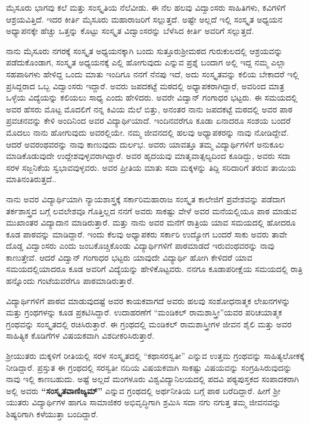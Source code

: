 {ಮೈಸೂರು ಭಾಗವು ಕಲೆ ಮತ್ತು ಸಂಸ್ಕೃತಿಯ ನೆಲೆವೀಡು. ಈ ನೆಲ ಹಲವು ವಿದ್ವಾಂಸರು ಸಾಹಿತಿಗಳು, ಕವಿಗಳಿಗೆ ಆಶ್ರಯವಿತ್ತಿದೆ. ಇದರ ಕೀರ್ತಿ ಮೈಸೂರು ಮಹಾರಾಜರಿಗೆ ಸಲ್ಲುತ್ತದೆ. ಅಷ್ಟೇ ಅಲ್ಲದೆ ಇಲ್ಲಿ ಸಂಸ್ಕೃತ ಅಧ್ಯಯನ ಅಧ್ಯಾಪನಕ್ಕೇ ಹೆಚ್ಚು ಒತ್ತನ್ನು ಕೊಟ್ಟು ಸಂಸ್ಕೃತ ವಿದ್ವಾಂಸರನ್ನು ಬೆಳೆಸಿದ ಕೀರ್ತಿ ಅವರಿಗೆ ಸಲ್ಲುತ್ತದೆ.

ನಾನು ಮೈಸೂರು ನಗರಕ್ಕೆ ಸಂಸ್ಕೃತ ಅಧ್ಯಯನಕ್ಕಾಗಿ ಬಂದು ಸುತ್ತೂರು\break ಶ್ರೀಮಠದ ಗುರುಕುಲದಲ್ಲಿ ಆಶ್ರಯವನ್ನು ಪಡೆದುಕೊಂಡಾಗ, ಸಂಸ್ಕೃತ ಅಧ್ಯಯನಕ್ಕೆ ಎಲ್ಲಿ ಹೋಗುವುದು ಎನ್ನುವ ಪ್ರಶ್ನೆ ಬಂದಾಗ ಅಲ್ಲಿ ಇದ್ದ ನಮ್ಮ ಎಲ್ಲಾ ಸಹಪಾಠಿಗಳು ಹೇಳಿದ್ದ ಒಂದು ಮಾತು ಇಂದಿಗೂ ನನಗೆ ನೆನಪು ಇದೆ, ಅದು ಸಂಸ್ಕೃತವನ್ನು ಕಲಿಯ ಬೇಕಾದರೆ ಇಲ್ಲಿ ಪ್ರಸಿದ್ದರಾದ ಒಬ್ಬ ವಿದ್ವಾಂಸರು ಇದ್ದಾರೆ. ಅವರು ಜಪದಕಟ್ಟೆ ಮಠದಲ್ಲಿ ಅಧ್ಯಾಪಕರಾಗಿದ್ದಾರೆ, ಅವರಿಂದ ಮಾತ್ರ ಒಳ್ಳೆಯ ವಿದ್ಯೆಯನ್ನು ಕಲಿಯಲು ಸಾಧ್ಯ ಎಂದು ಹೇಳಿದರು. ಅವರೇ ವಿದ್ವಾನ್ ಗಂಗಾಧರ ಭಟ್ಟರು. ಈ ಸಮಯದಲ್ಲಿ ಅವರ ಹೆಸರು ಮೊಟ್ಟ ಮೊದಲಿಗೆ ನನ್ನ ಕಿವಿಯ ಮೆಲೆ ಬಿತ್ತು, ಅನಂತರ ನಾನು ಜಪದಕಟ್ಟೆ ಮಠದಲ್ಲಿ ಅವರ ಪಾಠ ಪ್ರವಚನವನ್ನು ಕೇಳಿ ಅಂದಿನಿಂದ ಅವರ ವಿದ್ಯಾರ್ಥಿಯಾದೆ. ಇಂದಿನವರೆಗೂ ಕೂಡಾ ಏನಾದರೂ ಸಂಶಯ ಬಂದರೆ ಮೊದಲು ನಾನು ಹೋಗುವುದು ಅವರಲ್ಲಿಯೇ. ನಮ್ಮ ಜೀವನದಲ್ಲಿ ಹಲವು ಅಧ್ಯಾಪಕರನ್ನು ನಾವು ನೋಡಿದ್ದೇವೆ. ಆದರೆ ಅವರಂಥವರನ್ನು ನಾವು ಕಾಣುವುದು ದುರ್ಲಭ. ಅವರು ಯಾವತ್ತೂ ತಮ್ಮ ವಿದ್ಯಾರ್ಥಿಗಳಿಗೆ ಅನುಕೂಲ ಮಾಡಿಕೊಡುವುದೇ ಉದ್ದೇಶವುಳ್ಳವರಾಗಿದ್ದಾರೆ. ಅವರ ಹೃದಯವು ಮಾತೃವಾತ್ಸಲ್ಯದಿಂದ ಕೂಡಿದ್ದು, ಅವರು ಸದಾ ಸರಳ ಸಜ್ಜನಿಕೆಯ ಸ್ವಭಾವವುಳ್ಳವರು. ಅವರ ಪ್ರೀತಿಯ ಮಾತು ಸದಾ ಮಕ್ಕಳನ್ನು ತಿದ್ದಿ ಸರಿದಾರಿಗೆ ತರುವ ತಾಯಿಯ ಮಾತಿನಂತಿರುತ್ತದೆ..

ನಾನು ಅವರ ವಿದ್ಯಾರ್ಥಿಯಾಗಿ ನ್ಯಾಯಶಾಸ್ತ್ರಕ್ಕೆ ಸರ್ಕಾರಿಮಹಾರಾಜ ಸಂಸ್ಕೃತ ಕಾಲೇಜಿಗೆ ಪ್ರವೇಶವನ್ನು ಪಡೆದಾಗ ತರ್ಕಶಾಸ್ತ್ರದ ಬಗ್ಗೆ ಲವಲೇಶವೂ ಗೊತ್ತಿಲ್ಲದ ನನಗೆ ಅವರು ಸಾಕಷ್ಟು ವೇಳೆ ಅವರ ಮನೆಯಲ್ಲಿಯೂ ಪಾಠ ಮಾಡುವ ಮುಖಾಂತರ ವಿದ್ಯಾದಾನ ಮಾಡಿರುತ್ತಾರೆ. ಮತ್ತು ನಾನು ಅವರ ಮನೆಗೆ ರಾತ್ರಿಯ ಯಾವ ಸಮಯದಲ್ಲಿ ಹೋದರೂ ಕೂಡ ಪಾಠವನ್ನು ಮಾಡಿದ್ದಾರೆ. ಇಂದು ಕೆಲವು ಅಧ್ಯಾಪಕರು ಸರ್ಕಾರಿ ಉದ್ಯೋಗ ಬಂದರೆ ಸಾಕು ಅವರು ತಾವೇ ದೊಡ್ಡ ವಿದ್ವಾಂಸರು ಎಂದು ಜಂಬಕೊಚ್ಚಿಕೊಂಡು ವಿದ್ಯಾರ್ಥಿಗಳಿಗೆ ಪಾಠಮಾಡದೆ ಇರುವಂಥವರನ್ನು ನಾವು ಕಾಣುತ್ತೇವೆ. ಆದರೆ ವಿದ್ವಾನ್ ಗಂಗಾಧರ ಭಟ್ಟರು ಯಾವುದೇ ವಿದ್ಯಾರ್ಥಿ ಹೋಗಿ ಕೇಳಿದರೆ ಯಾವ ಸಮಯ\-ದಲ್ಲಿಯಾದರೂ ಕೂಡ ಅವರಿಗೆ ವಿದ್ಯೆಯನ್ನು ಹೇಳಿಕೊಟ್ಟವರು. ನನಗೂ ಕೂಡಾ\break ಪರೀಕ್ಷೆಯ ಸಮಯದಲ್ಲಿ ರಾತ್ರಿ ಹನ್ನೊಂದು ಗಂಟೆಯವರೆಗೂ ಪಾಠಮಾಡಿರುತ್ತಾರೆ.

ವಿದ್ಯಾರ್ಥಿಗಳಿಗೆ ಪಾಠವ ಮಾಡುವುದಷ್ಟೆ ಅವರ ಕಾಯಕವಾಗದೆ ಅವರು ಹಲವು ಸಂಶೋಧನಾತ್ಮಕ ಲೇಖನಗಳನ್ನು ಮತ್ತು ಗ್ರಂಥಗಳನ್ನು ಕೂಡ ಪ್ರಕಟಿಸಿದ್ದಾರೆ. ಉದಾ\-ಹರಣೆಗೆ “ಮಂಡಿಕಲ್ ರಾಮಶಾಸ್ತ್ರೀ”ಯವರ ಪರಿಚಯಾತ್ಮಕ ಗ್ರಂಥವನ್ನು ಸಂಸ್ಕೃತದಲ್ಲಿ ರಚಿಸಿರುತ್ತಾರೆ. ಈ ಗ್ರಂಥದಲ್ಲಿ ಮಂಡಿಕಲ್ ರಾಮಶಾಸ್ತ್ರೀಗಳ ಜೀವನ ಶೈಲಿ ಮತ್ತು ಅವರ ಸಾಹಿತ್ಯಿಕ ಕೊಡಿಗೆಗಳ ವಿಷಯಕವಾಗಿ ವಿಶದೀಕರಿಸಿರುತ್ತಾರೆ.

ಶ್ರೀಯುತರು ಮಕ್ಕಳಿಗೆ  ರೀತಿಯಲ್ಲಿ ಸರಳ ಸಂಸ್ಕೃತದಲ್ಲಿ “ಕಥಾಸರಸ್ವತೀ” ಎನ್ನುವ ಉತ್ತಮ ಗ್ರಂಥವನ್ನು ಸಾಹಿತ್ಯಲೋಕಕ್ಕೆ ನೀಡಿದ್ದಾರೆ. ಪ್ರಸ್ತುತ ಈ ಗ್ರಂಥದಲ್ಲಿ ಸರಸ್ವತೀ ನದಿಯ ವಿಷಯಕವಾಗಿ ಸಾಕಷ್ಟು ವಿಷಯವನ್ನು ಸಂಗ್ರಹಿಸಿರುವುದನ್ನು ನಾವು ಇಲ್ಲಿ ಕಾಣಬಹುದು. ಅಷ್ಟೆ ಅಲ್ಲದೆ ಮಂಗಳೂರು ವಿಶ್ವವಿದ್ಯಾನಿಲಯದಲ್ಲಿ ಪದವಿ ಪಠ್ಯಪುಸ್ತಕದ ಸಂಪಾದಕರಾಗಿ ಅಲ್ಲಿ ಅವರು \textbf{“ಸಂಸ್ಕೃತವಾಣಿಜ್ಯಮ್”} ಎನ್ನುವ ಗ್ರಂಥದಲ್ಲಿ ಅರ್ಥನೀತಿಯ ಬಗ್ಗೆ ಪಾಠ ಬರೆದಿದ್ದಾರೆ. ಹೀಗೆ ಶ್ರೀ ಯುತರು ವಿದ್ಯಾರ್ಥಿಗಳ ಹಾಗೂ ಸಾಮಾಜಿಕರ ಅಭಿವೃದ್ಧಿಗಾಗಿ ಶ್ರಮಿಸಿ ಸದಾ ನಗು ನಗುತ್ತ ತಮ್ಮ ಜೀವನವನ್ನು ಶಿಷ್ಯರಿಗಾಗಿ ಕಳೆಯುತ್ತಾ ಬಂದಿದ್ದಾರೆ.

}
